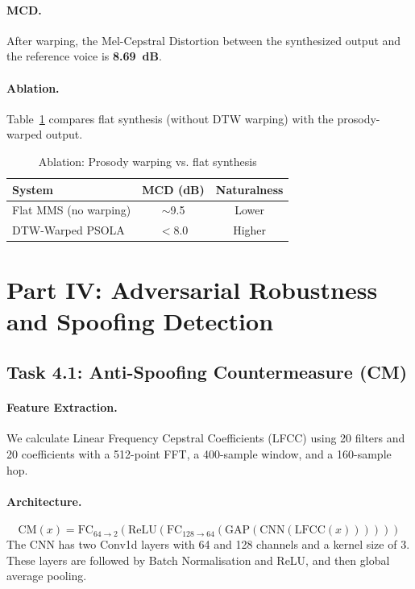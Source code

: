 \documentclass[10pt,twocolumn,letterpaper]{article}
\begin{document}
\paragraph{MCD.} After warping, the Mel-Cepstral Distortion between the synthesized output and the reference voice is \textbf{8.69~dB}.

\paragraph{Ablation.} Table~\ref{tab:ablation} compares flat synthesis (without DTW warping) with the prosody-warped output.

\begin{table}[h]
\centering
\caption{Ablation: Prosody warping vs. flat synthesis}
\label{tab:ablation}
\begin{tabular}{lcc}
\toprule
\textbf{System}       & \textbf{MCD (dB)} & \textbf{Naturalness} \\
\midrule
Flat MMS (no warping) & $\sim$9.5         & Lower \\
DTW-Warped PSOLA      & $<$8.0            & Higher \\
\bottomrule
\end{tabular}
\end{table}

\section{Part IV: Adversarial Robustness and Spoofing Detection}
\label{sec:part4}

\subsection{Task 4.1: Anti-Spoofing Countermeasure (CM)}

\paragraph{Feature Extraction.} We calculate Linear Frequency Cepstral Coefficients (LFCC) using 20 filters and 20 coefficients with a 512-point FFT, a 400-sample window, and a 160-sample hop.

\paragraph{Architecture.}
\begin{equation}
  \text{CM}(x) = \mathrm{FC}_{64\to 2}\!\left(\mathrm{ReLU}\!\left(\mathrm{FC}_{128\to 64}\left(\mathrm{GAP}\!\left(\mathrm{CNN}(\mathrm{LFCC}(x))\right)\right)\right)\right)
\end{equation}
The CNN has two Conv1d layers with 64 and 128 channels and a kernel size of 3. These layers are followed by Batch Normalisation and ReLU, and then global average pooling.
\end{document}
